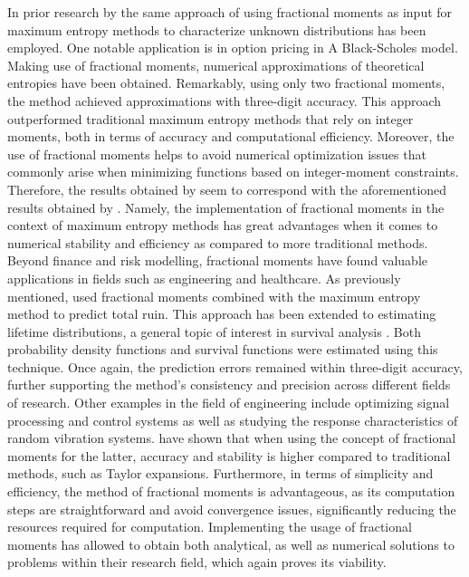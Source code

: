 \newline
In prior research by \cite{DAmico2002}  the same approach of using fractional moments as input for maximum entropy methods to characterize unknown distributions has been employed. One notable application is in option pricing in A Black-Scholes model. Making use of fractional moments, numerical approximations of theoretical entropies have been obtained. Remarkably, using only two fractional moments, the method achieved approximations with three-digit accuracy.
\newline
 This approach outperformed traditional maximum entropy methods that rely on integer moments, both in terms of accuracy and computational efficiency. Moreover, the use of fractional moments helps to avoid numerical optimization issues that commonly arise when minimizing functions based on integer-moment constraints. Therefore, the results obtained by \cite{DAmico2002} seem to correspond with the aforementioned results obtained by \cite{gyzl2013}. Namely, the implementation of fractional moments in the context of maximum entropy methods has great advantages when it comes to numerical stability and efficiency as compared to more traditional methods. 
\newline
Beyond finance and risk modelling, fractional moments have found valuable applications in fields such as engineering and healthcare. As previously mentioned, \cite{gyzl2024} used fractional moments combined with the maximum entropy method to predict total ruin. This approach has been extended to estimating lifetime distributions, a general topic of interest in survival analysis \cite{clark2003}. Both probability density functions and survival functions were estimated using this technique. Once again, the prediction errors remained within three-digit accuracy, further supporting the method’s consistency and precision across different fields of research.
\newline
Other examples in the field of engineering include optimizing signal processing and control systems as well as studying the response characteristics of random vibration systems. \cite{wang2025} have shown that when using the concept of fractional moments for the latter, accuracy and stability is higher compared to traditional methods, such as Taylor expansions. Furthermore, in terms of simplicity and efficiency, the method of fractional moments is advantageous, as its computation steps are straightforward and avoid convergence issues, significantly reducing the resources required for computation. Implementing the usage of fractional moments has allowed \cite{wang2025} to obtain both analytical, as well as numerical solutions to problems within their research field, which again proves its viability. 
